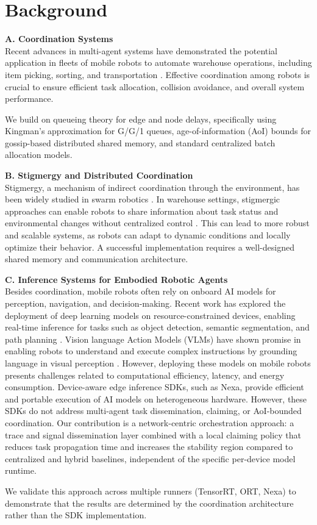 \section{Background}


\textbf{A. Coordination Systems} \\
Recent advances in multi-agent systems have demonstrated the potential application in fleets of mobile robots to automate warehouse operations, including item picking, sorting, and transportation \cite{agaskar2025deepfleet}. Effective coordination among robots is crucial to ensure efficient task allocation, collision avoidance, and overall system performance.

We build on queueing theory for edge and node delays, specifically using Kingman's approximation for G/G/1 queues, age-of-information (AoI) bounds for gossip-based distributed shared memory, and standard centralized batch allocation models.

\textbf{B. Stigmergy and Distributed Coordination} \\
Stigmergy, a mechanism of indirect coordination through the environment, has been widely studied in swarm robotics \cite{garnier2007biological, brambilla2013swarm}. In warehouse settings, stigmergic approaches can enable robots to share information about task status and environmental changes without centralized control \cite{payton2001pheromone, labella2004division}. This can lead to more robust and scalable systems, as robots can adapt to dynamic conditions and locally optimize their behavior. A successful implementation requires a well-designed shared memory and communication architecture.

\textbf{C. Inference Systems for Embodied Robotic Agents} \\
Besides coordination, mobile robots often rely on onboard AI models for perception, navigation, and decision-making. Recent work has explored the deployment of deep learning models on resource-constrained devices, enabling real-time inference for tasks such as object detection, semantic segmentation, and path planning \cite{redmon2018yolov3, he2017mask}. Vision language Action Models (VLMs) have shown promise in enabling robots to understand and execute complex instructions by grounding language in visual perception \cite{shah2023vlm, singh2022flamingo}. However, deploying these models on mobile robots presents challenges related to computational efficiency, latency, and energy consumption.
Device-aware edge inference SDKs, such as Nexa, provide efficient and portable execution of AI models on heterogeneous hardware. However, these SDKs do not address multi-agent task dissemination, claiming, or AoI-bounded coordination. Our contribution is a network-centric orchestration approach: a trace and signal dissemination layer combined with a local claiming policy that reduces task propagation time and increases the stability region compared to centralized and hybrid baselines, independent of the specific per-device model runtime.

We validate this approach across multiple runners (TensorRT, ORT, Nexa) to demonstrate that the results are determined by the coordination architecture rather than the SDK implementation.